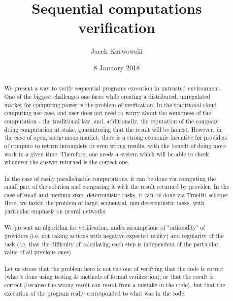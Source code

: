 \documentclass{winnower}
\begin{document}
\title{\LARGE \bf
Sequential computations verification}


\author{Jacek Karwowski}

\date{8 January 2018}

\maketitle

\begin{abstract}
We present a way to verify sequential programs execution in untrusted environment. 
One of the biggest challenges one faces while creating a distributed, unregulated market for computing power is the problem of verification. In the traditional cloud computing use case, end user does not need to worry about the soundness of the computation - the traditional law, and, additionally, the reputation of the company doing computation at stake, guaranteeing that the result will be honest. However, in the case of open, anonymous market, there is a strong economic incentive for providers of compute to return incomplete or even wrong results, with the benefit of doing more work in a given time. Therefore, one needs a system which will be able to check whenever the answer returned is the correct one. \\
\\
In the case of easily parallelizable computations, it can be done via computing the small part of the solution and comparing it with the result returned by provider. In the case of small and medium-sized deterministic tasks, it can be done via TrueBit scheme. Here, we tackle the problem of large, sequential, non-deterministic tasks, with particular emphasis on neural networks. \\
\\
We present an algorithm for verification, under assumptions of "rationality" of providers (i.e. not taking actions with negative expected utility) and regularity of the task (i.e. that the difficulty of calculating each step is independent of the particular value of all previous ones)\\
\\
Let us stress that the problem here is not the one of verifying that the code is correct (what's done using testing \& methods of formal verification), or that the result is correct (because the wrong result can result from a mistake in the code), but that the execution of the program really corresponded to what was in the code.

\end{abstract}
\end{document}
